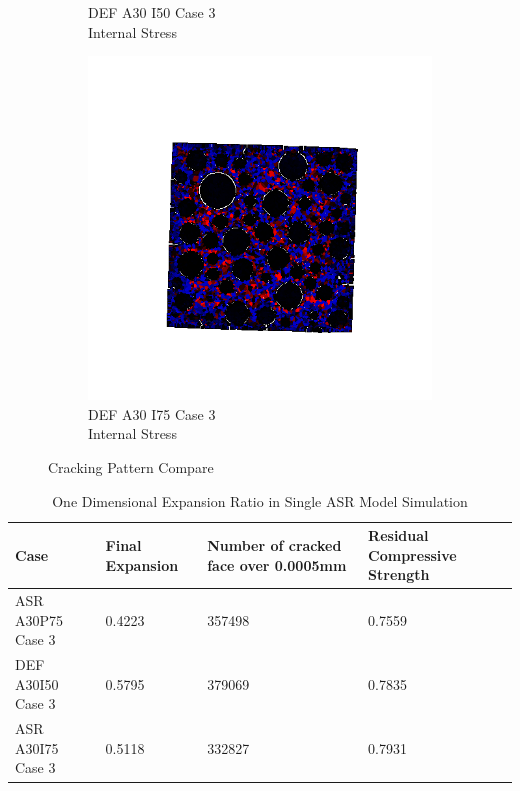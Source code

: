\begin{figure}[ht]
\begin{subfigure}{.33\textwidth}
      \caption{DEF A30 I50 Case 3 \\ Internal Stress}
    \end{subfigure}%
    \begin{subfigure}{.33\textwidth}
      \centering
      \includegraphics[width=1.0\linewidth]{Files/exp_3D/DEF/A30X-5C_3_stress.png}
      \caption{DEF A30 I75 Case 3 \\ Internal Stress}
    \end{subfigure}
  \caption{Cracking Pattern Compare}
  \label{fig:ASR_A30P75_3_3D}
\end{figure}

\begin{table}[ht!]
\centering
\begin{tabular}{ |p{4cm}|p{2cm}|p{3cm}|p{3cm}| }
 \hline
 Case &  Final Expansion  & Number of cracked face over 0.0005mm & Residual Compressive Strength\\ [0.5ex]
 \hline
 ASR A30P75 Case 3 & 0.4223 & 357498 & 0.7559 \\ \hline
 DEF A30I50 Case 3 & 0.5795 & 379069 & 0.7835 \\ \hline
 ASR A30I75 Case 3 & 0.5118 & 332827 & 0.7931 \\
 \hline
\end{tabular}
\caption{One Dimensional Expansion Ratio in Single ASR Model Simulation}
\label{table:ASR_30_EXP}
\end{table}

